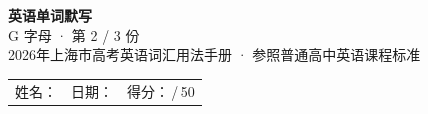 \documentclass[10pt,a4paper]{article}
\begin{document}
\pagestyle{plain}

\begin{center}
{\LARGE\bfseries 英语单词默写}\\[0.22em]
{\large G 字母 · 第 2 / 3 份}\\[0.18em]
{\small 2026年上海市高考英语词汇用法手册 · 参照普通高中英语课程标准}
\end{center}

\vspace{0.25em}
\noindent\begin{tabular}{@{}p{}@{}p{}@{}p{}@{}}
姓名：\underline{\hspace{2.0cm}} & 日期：\underline{\hspace{2.0cm}} & 得分：\underline{\hspace{1.3cm}}\,/\,50 \\
\end{tabular}

\vspace{0.3em}

\vspace{0.08em}
\end{document}

